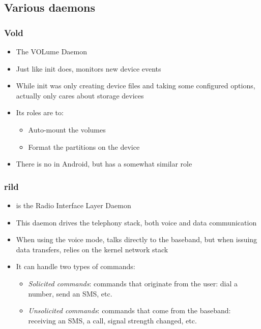 \subsection{Various daemons}
\begin{frame}
  \frametitle{Vold}
  \begin{itemize}
  \item The VOLume Daemon
  \item Just like init does, monitors new device events
  \item While init was only creating device files and taking some
    configured options,  actually only cares about storage
    devices
  \item Its roles are to:
    \begin{itemize}
    \item Auto-mount the volumes
    \item Format the partitions on the device
    \end{itemize}
  \item There is no  in Android, but
     has a somewhat similar role
  \end{itemize}
\end{frame}

\begin{frame}
  \frametitle{rild}
  \begin{itemize}
  \item {} is the Radio Interface Layer Daemon
  \item This daemon drives the telephony stack, both voice and data
    communication
  \item When using the voice mode, talks directly to the baseband, but
    when issuing data transfers, relies on the kernel network stack
  \item It can handle two types of commands:
    \begin{itemize}
    \item \textit{Solicited commands}: commands that originate from
      the user: dial a number, send an SMS, etc.
    \item \textit{Unsolicited commands}: commands that come from the
      baseband: receiving an SMS, a call, signal strength changed, etc.
    \end{itemize}
  \end{itemize}
\end{frame}


